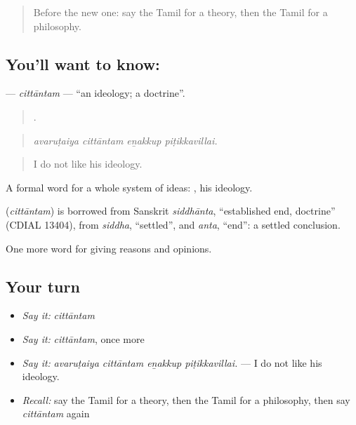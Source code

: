 \label{lesson:TA-C358-cittantam}



\begin{quote}
Before the new one: say the Tamil for a theory, then the Tamil for a philosophy.
\end{quote}

\subsection*{You'll want to know: }
\textbf{} — \emph{cittāntam} — \textquotedblleft{}an ideology; a doctrine\textquotedblright{}.

\begin{quote}
   .
\end{quote}

\begin{quote}
\emph{avaruṭaiya cittāntam eṉakkup piṭikkavillai.}
\end{quote}

\begin{quote}
I do not like his ideology.
\end{quote}

A formal word for a whole system of ideas:  , his ideology.

\begin{cousinweb}
\textbf{} (\emph{cittāntam}) is borrowed from Sanskrit \emph{siddhānta}, \textquotedblleft{}established end, doctrine\textquotedblright{} (CDIAL 13404), from \emph{siddha}, \textquotedblleft{}settled\textquotedblright{}, and \emph{anta}, \textquotedblleft{}end\textquotedblright{}: a settled conclusion.
\end{cousinweb}

\begin{grammarlens}[title={What you've built}]
One more word for giving reasons and opinions.
\end{grammarlens}

\subsection*{Your turn}
\begin{itemize}
\raggedright
  \item \emph{Say it:} \emph{cittāntam}
  \item \emph{Say it:} \emph{cittāntam}, once more
  \item \emph{Say it:} \emph{avaruṭaiya cittāntam eṉakkup piṭikkavillai.} — I do not like his ideology.
  \item \emph{Recall:} say the Tamil for a theory, then the Tamil for a philosophy, then say \emph{cittāntam} again
\end{itemize}

